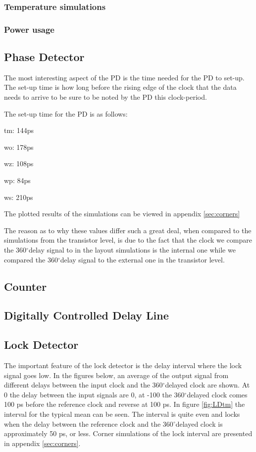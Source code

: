 \documentclass[a4paper,12pt]{article} \usepackage{graphicx}
\newcommand{\degree}{\ensuremath{^\circ}}
\begin{document}
\subsubsection{Temperature simulations}
\subsubsection{Power usage}
\subsection{Phase Detector}
The most interesting aspect of the PD is the time
needed for the PD to set-up. The set-up time is how long
 before the rising edge of the clock that the data needs 
 to arrive to be sure to be noted by the PD this clock-period.

The set-up time for the PD is as follows:

tm: 144ps

wo: 178ps

wz: 108ps

wp: 84ps

ws: 210ps

The plotted results of the simulations can be viewed in appendix \ref{sec:corners}

The reason as to why these values differ such a great deal, when compared 
to the simulations from the transistor level, is due to the fact that the 
clock we compare the 360\degree delay signal to in the layout simulations 
is the internal one while we compared the 360\degree delay signal to the 
external one in the transistor level.



\subsection{Counter}
\subsection{Digitally Controlled Delay Line}
\subsection{Lock Detector}
The important feature of the lock detector is the delay interval where
the lock signal goes low. In the figures below, an average of the
output signal from different delays between the input clock and the
360\degree delayed clock are shown. At 0 the delay between the input
signals are 0, at -100 the 360\degree delayed clock comes 100 ps
before the reference clock and reverse at 100 ps. In figure
\ref{fig:LDtm} the interval for the typical mean can be seen. The interval 
is quite even and locks when the delay between the reference
clock and the 360\degree delayed clock is approximately 50 ps, or
less. Corner simulations of the lock interval are presented in
appendix \ref{sec:corners}.
\end{document}
